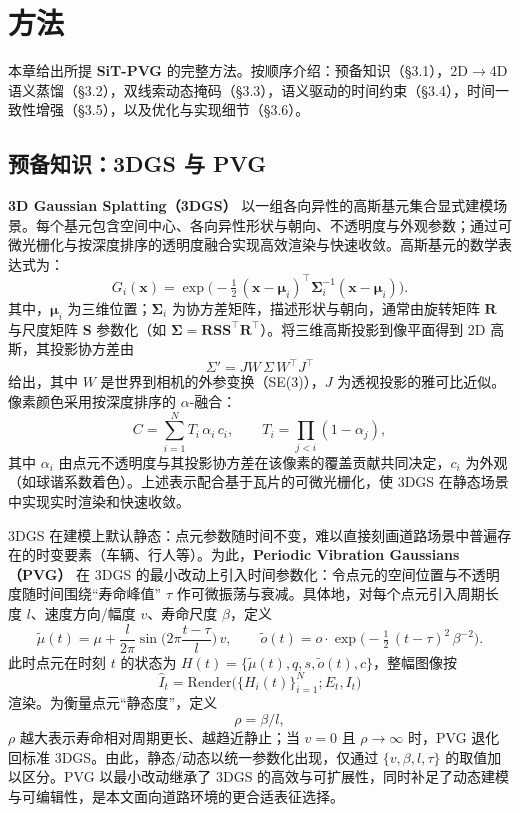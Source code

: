 \documentclass[10pt,conference]{IEEEtran} %
\begin{document}
\section{方法}
本章给出所提 \textbf{SiT-PVG} 的完整方法。按顺序介绍：预备知识（§3.1），2D$\rightarrow$4D 语义蒸馏（§3.2），双线索动态掩码（§3.3），语义驱动的时间约束（§3.4），时间一致性增强（§3.5），以及优化与实现细节（§3.6）。

\subsection{预备知识：3DGS 与 PVG}
\textbf{3D Gaussian Splatting（3DGS）} 以一组各向异性的高斯基元集合显式建模场景。每个基元包含空间中心、各向异性形状与朝向、不透明度与外观参数；通过可微光栅化与按深度排序的透明度融合实现高效渲染与快速收敛。高斯基元的数学表达式为：
\begin{equation}
G_i(\bm{x})
=\exp\!\Big(-\tfrac{1}{2}\,(\bm{x}-\bm{\mu}_i)^\top \bm{\Sigma}_i^{-1}(\bm{x}-\bm{\mu}_i)\Big).
\end{equation}
其中，$\bm{\mu}_i$ 为三维位置；$\bm{\Sigma}_i$ 为协方差矩阵，描述形状与朝向，通常由旋转矩阵 $\mathbf{R}$ 与尺度矩阵 $\mathbf{S}$ 参数化（如 $\bm{\Sigma}=\mathbf{R}\mathbf{S}\mathbf{S}^\top\mathbf{R}^\top$）。将三维高斯投影到像平面得到 2D 高斯，其投影协方差由
\begin{equation}
\Sigma' = J W \,\Sigma\, W^\top J^\top
\end{equation}
给出，其中 $W$ 是世界到相机的外参变换（SE(3)），$J$ 为透视投影的雅可比近似。像素颜色采用按深度排序的 $\alpha$-融合：
\begin{equation}
C=\sum_{i=1}^{N} T_i\,\alpha_i\,c_i,\qquad 
T_i=\prod_{j<i}(1-\alpha_j),
\end{equation}
其中 $\alpha_i$ 由点元不透明度与其投影协方差在该像素的覆盖贡献共同决定，$c_i$ 为外观（如球谐系数着色）。上述表示配合基于瓦片的可微光栅化，使 3DGS 在静态场景中实现实时渲染和快速收敛。

3DGS 在建模上默认静态：点元参数随时间不变，难以直接刻画道路场景中普遍存在的时变要素（车辆、行人等）。为此，\textbf{Periodic Vibration Gaussians（PVG）} 在 3DGS 的最小改动上引入时间参数化：令点元的空间位置与不透明度随时间围绕“寿命峰值” $\tau$ 作可微振荡与衰减。具体地，对每个点元引入周期长度 $l$、速度方向/幅度 $v$、寿命尺度 $\beta$，定义
\begin{equation}
\tilde\mu(t)=\mu+\frac{l}{2\pi}\sin\!\Big(2\pi\frac{t-\tau}{l}\Big)\,v,\qquad
\tilde o(t)=o\cdot \exp\!\Big(-\tfrac12\,(t-\tau)^2\,\beta^{-2}\Big).
\end{equation}
此时点元在时刻 $t$ 的状态为 $H(t)=\{\tilde\mu(t),q,s,\tilde o(t),c\}$，整幅图像按
\begin{equation}
\hat I_t=\mathrm{Render}\big(\{H_i(t)\}_{i=1}^{N};E_t,I_t\big)
\end{equation}
渲染。为衡量点元“静态度”，定义
\begin{equation}
\rho=\beta/l,
\end{equation}
$\rho$ 越大表示寿命相对周期更长、越趋近静止；当 $v=0$ 且 $\rho\to\infty$ 时，PVG 退化回标准 3DGS。由此，静态/动态以统一参数化出现，仅通过 $\{v,\beta,l,\tau\}$ 的取值加以区分。PVG 以最小改动继承了 3DGS 的高效与可扩展性，同时补足了动态建模与可编辑性，是本文面向道路环境的更合适表征选择。
\end{document}
